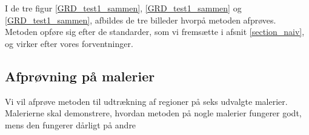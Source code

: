 \begin{figure}[!h]
    \centering
    	\hspace{1em}
		\hspace{1em}
        \caption[]{}
     \label{GRD_test3_sammen}
\end{figure}

I de tre figur \ref{GRD_test1_sammen}, \ref{GRD_test1_sammen} og
\ref{GRD_test1_sammen}, afbildes de tre billeder hvorpå metoden afprøves.
Metoden opføre sig efter de standarder, som vi fremsætte i afsnit \ref{section_naiv}, og
virker efter vores forventninger.
\clearpage

\subsection{Afprøvning på malerier}
Vi vil afprøve metoden til udtrækning af regioner på seks udvalgte
malerier. Malerierne skal demonstrere, hvordan metoden på nogle malerier
fungerer godt, mens den fungerer dårligt på andre

